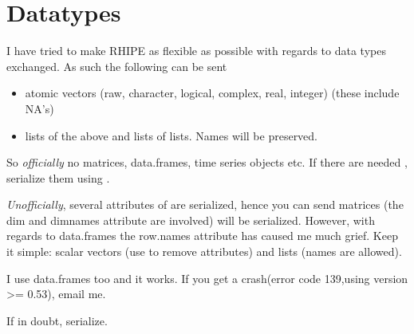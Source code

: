 \documentclass[letterpaper,10pt,english]{sphinxmanual}
\begin{document}
\chapter{Datatypes}
\label{datatypes:datatypes}\label{datatypes::doc}
I have tried to make RHIPE as flexible as possible with regards to data types exchanged. As such the following can be sent
\begin{itemize}
\item {} 
atomic vectors (raw, character, logical, complex, real, integer) (these include NA's)

\item {} 
lists of the above and lists of lists. Names will be preserved.

\end{itemize}

So \emph{officially} no matrices, data.frames, time series objects etc. If there are needed , serialize them using  .

\emph{Unofficially}, several attributes of are serialized, hence you can send matrices (the dim and  dimnames attribute are involved) will be serialized.
However, with regards to data.frames the row.names attribute has caused me much grief. Keep it simple: scalar vectors (use  to remove attributes) and lists (names are allowed).

I use data.frames too and it works. If you get a crash(error code 139,using version \textgreater{}= 0.53), email me.

If in doubt, serialize.



\renewcommand{\indexname}{Index}
\printindex
\end{document}
